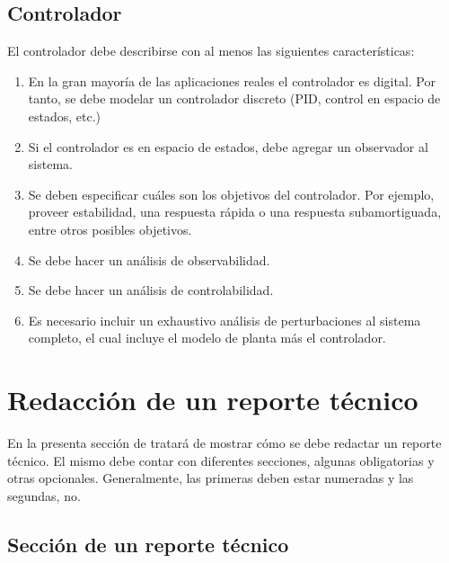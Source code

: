\documentclass{article}
\begin{document}
\subsection{Controlador}
\label{sec:controlador}

El controlador debe describirse con al menos las siguientes características:

\begin{enumerate}

    \item En la gran mayoría de las aplicaciones reales el controlador es digital. Por tanto, se debe modelar un controlador discreto (PID, control en espacio de estados, etc.)
    
    \item Si el controlador es en espacio de estados, debe agregar un observador al sistema.
    
    \item Se deben especificar cuáles son los objetivos del controlador. Por ejemplo, proveer estabilidad, una respuesta rápida o una respuesta subamortiguada, entre otros posibles objetivos.
    
    \item Se debe hacer un análisis de observabilidad.
        
    \item Se debe hacer un análisis de controlabilidad.
    
    \item Es necesario incluir un exhaustivo análisis de perturbaciones al sistema completo, el cual incluye el modelo de planta más el controlador.
    
\end{enumerate}
\section{Redacción de un reporte técnico}
\label{sec:reporte-tecnico}

En la presenta sección de tratará de mostrar cómo se debe redactar un reporte técnico. El mismo debe contar con diferentes secciones, algunas obligatorias y otras opcionales. Generalmente, las primeras deben estar numeradas y las segundas, no. 

\subsection{Sección de un reporte técnico}
\label{sec:secciones}
\end{document}
